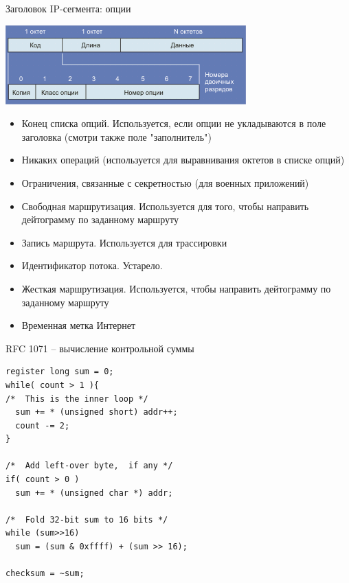 \begin{frame}{Заголовок IP-сегмента: опции}
	\begin{center}
		\includegraphics[height=0.2\textheight]{03-ip_option.png}
	\end{center}
	\scriptsize
	\begin{itemize}
		\item Конец списка опций. Используется,  если опции не укладываются в поле заголовка (смотри также поле "заполнитель")
		\item Никаких операций (используется для выравнивания октетов в списке опций)
		\item Ограничения,  связанные с секретностью (для военных приложений)
		\item Свободная маршрутизация. Используется для того,  чтобы направить дейтограмму по заданному маршруту
		\item Запись маршрута. Используется для трассировки
		\item Идентификатор потока. Устарело.
		\item Жесткая маршрутизация. Используется,  чтобы направить дейтограмму по заданному маршруту
		\item Временная метка Интернет
	\end{itemize}
	\normalsize
\end{frame}

\begin{frame}[fragile]{RFC 1071 -- вычисление контрольной суммы}
	\scriptsize	
\begin{lstlisting}[Language=C]
register long sum = 0;
while( count > 1 ){
/*  This is the inner loop */
  sum += * (unsigned short) addr++;
  count -= 2;
}

/*  Add left-over byte,  if any */
if( count > 0 )
  sum += * (unsigned char *) addr;

/*  Fold 32-bit sum to 16 bits */
while (sum>>16)
  sum = (sum & 0xffff) + (sum >> 16);

checksum = ~sum;
\end{lstlisting}
	\normalsize
\end{frame}

